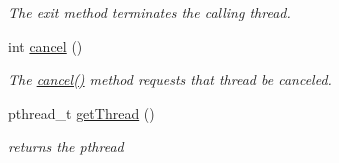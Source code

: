 \begin{DoxyCompactItemize}
\begin{DoxyCompactList}\small\item\em \-The exit method terminates the calling thread. \end{DoxyCompactList}\item 
int \hyperlink{class_thread_ae2c546a555661d19d7e06d7e1d44b6e6}{cancel} ()
\begin{DoxyCompactList}\small\item\em \-The \hyperlink{class_thread_ae2c546a555661d19d7e06d7e1d44b6e6}{cancel()} method requests that thread be canceled. \end{DoxyCompactList}\item 
pthread\-\_\-t \hyperlink{class_thread_aba840d6f1720be0c074b5a0d229d95f3}{get\-Thread} ()
\begin{DoxyCompactList}\small\item\em returns the pthread \end{DoxyCompactList}\end{DoxyCompactItemize}


